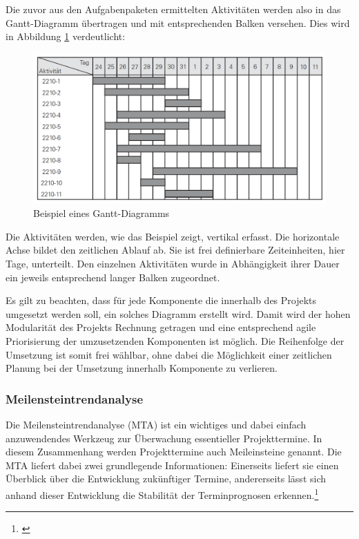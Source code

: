 Die zuvor aus den Aufgabenpaketen ermittelten Aktivitäten werden also in das Gantt-Diagramm übertragen und mit entsprechenden Balken versehen. Dies wird in Abbildung \ref{fig_beispiel_gantt_diagramm} verdeutlicht:

\begin{figure}[h!]
	\centering
	\includegraphics[width=\textwidth]
	{kapitel/gruppe4_2/bilder/beispiel_gantt_diagramm}
	\caption{Beispiel eines Gantt-Diagramms}
	\label{fig_beispiel_gantt_diagramm}
\end{figure}

Die Aktivitäten werden, wie das Beispiel zeigt, vertikal erfasst. Die horizontale Achse bildet den zeitlichen Ablauf ab. Sie ist frei definierbare Zeiteinheiten, hier Tage, unterteilt. Den einzelnen Aktivitäten wurde in Abhängigkeit ihrer Dauer ein jeweils entsprechend langer Balken zugeordnet.

Es gilt zu beachten, dass für jede Komponente die innerhalb des Projekts umgesetzt werden soll, ein solches Diagramm erstellt wird. Damit wird der hohen Modularität des Projekts Rechnung getragen und eine entsprechend agile Priorisierung der umzusetzenden Komponenten ist möglich. Die Reihenfolge der Umsetzung ist somit frei wählbar, ohne dabei die Möglichkeit einer zeitlichen Planung bei der Umsetzung innerhalb Komponente zu verlieren.

\subsubsection{Meilensteintrendanalyse}
Die Meilensteintrendanalyse (MTA) ist ein wichtiges und dabei einfach anzuwendendes Werkzeug zur Überwachung essentieller Projekttermine. In diesem Zusammenhang werden Projekttermine auch Meileinsteine genannt. Die MTA liefert dabei zwei grundlegende Informationen: Einerseits liefert sie einen Überblick über die Entwicklung zukünftiger Termine, andererseits lässt sich anhand dieser Entwicklung die Stabilität der Terminprognosen erkennen.\footnote{\cite{gadatsch_masterkurs_2014}}

